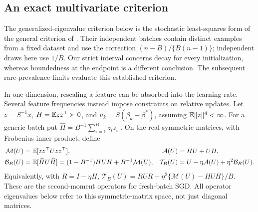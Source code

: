 \subsection{An exact multivariate criterion}

The generalized-eigenvalue criterion below is the stochastic least-squares form
of the general criterion of \citet[Theorems~5 and~14]{mulayoff2024exact}. Their
independent batches contain distinct examples from a fixed dataset and use the
correction $(n - B)/\{B(n - 1)\}$; independent draws here use $1/B$. Our strict
interval concerns decay for every initialization, whereas boundedness at the
endpoint is a different conclusion. The subsequent rare-prevalence limits
evaluate this established criterion.

In one dimension, rescaling a feature can be absorbed into the learning rate.
Several feature frequencies instead impose constraints on relative updates. Let
$z = S^{-1}x$, $H = \mathbb{E} zz^\top \succ 0$, and $u_k = S(\beta_k - \beta^*)$,
assuming $\mathbb{E}\|z\|^4 < \infty$. For a generic batch put
$\widehat H = B^{-1}\sum_{i=1}^Bz_i z_i^\top$. On the real symmetric matrices,
with Frobenius inner product, define
\begin{align*}
 \mathcal M(U)   & = \mathbb{E}[zz^\top Uzz^\top],                                               & \mathcal A(U)   & = HU + UH,                                       \\
 \mathcal B_B(U) & = \mathbb{E}[\widehat H U\widehat H] = (1 - B^{-1})HUH + B^{-1}\mathcal M(U), & \mathcal T_B(U) & = U - \eta\mathcal A(U) + \eta^2\mathcal B_B(U).
\end{align*}
Equivalently, with $R = I - \eta H$,
$\mathcal T_B(U) = RUR + \eta^2\{\mathcal M(U) - HUH\}/B$. These are the
second-moment operators for fresh-batch SGD. All operator eigenvalues below
refer to this symmetric-matrix space, not just diagonal matrices.

